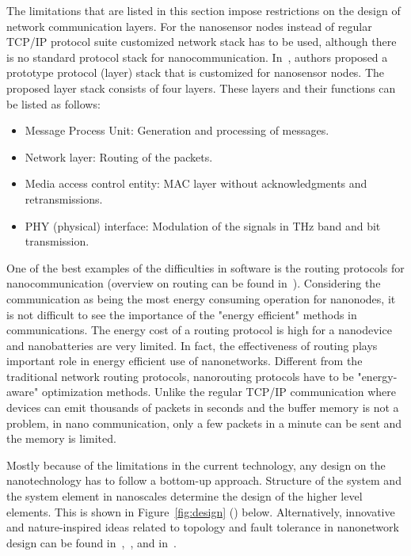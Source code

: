 \documentclass[12pt, oneandhalf, chaparabic, sees, ms]{metu}
\begin{document}
The limitations that are listed in this section impose restrictions on the design of network communication layers. 
For the nanosensor nodes instead of regular TCP/IP protocol suite customized network stack has to be used, although there is no standard protocol stack for nanocommunication.
In~\cite{piroNS32013}, authors proposed a prototype protocol (layer) stack that is customized for nanosensor nodes. The proposed layer stack consists of four layers. 
These layers and their functions can be listed as follows:
\begin{itemize}
\item Message Process Unit: Generation and processing of messages.
\item Network layer: Routing of the packets.
\item Media access control entity: MAC layer without acknowledgments and retransmissions.
\item PHY (physical) interface: Modulation of the signals in THz band and bit transmission.
\end{itemize}
One of the best examples of the difficulties in software is the routing protocols for nanocommunication (overview on routing can be found in~\cite{neupane2014}). Considering the communication as being the most energy consuming operation for nanonodes, it is not difficult to see the importance of the "energy efficient" methods in communications. The energy cost of a routing protocol is high for a 
nanodevice and nanobatteries are very limited. In fact, the effectiveness of routing plays important role in energy efficient use of nanonetworks. Different from the traditional network routing protocols, nanorouting protocols have to be "energy-aware" optimization methods. Unlike the regular TCP/IP communication where devices can emit thousands of packets in seconds and the buffer memory is not a problem, in nano communication, only a few packets in a minute can be sent and the memory is limited. 

\newpage
Mostly because of the limitations in the current technology, any design on the nanotechnology has to follow a bottom-up approach. Structure of the system and the system element in 
nanoscales determine the design of the  higher level elements. This is shown in Figure~\ref{fig:design} (\cite{akyildiz2010-1}) below. Alternatively, innovative and nature-inspired ideas related to topology and fault tolerance in nanonetwork design can be found in~\cite{ilhan2016},~\cite{senel2011}, and in~\cite{imran2012}.
\end{document}
